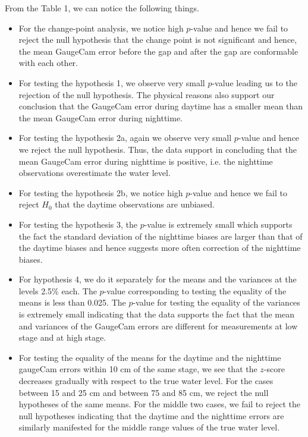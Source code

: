\documentclass[]{article}
\begin{document}
From the Table 1, we can notice the following things.

\begin{itemize}
\item For the change-point analysis, we notice high $p$-value and hence we fail to reject the null hypothesis that the change point is not significant and hence, the mean GaugeCam error before the gap and after the gap are conformable with each other.
\item For testing the hypothesis 1, we observe very small $p$-value leading us to the rejection of the null hypothesis. The physical reasons also support our conclusion that the GaugeCam error during daytime has a smaller mean than the mean GaugeCam error during nighttime.
\item For testing the hypothesis 2a, again we observe very small $p$-value and hence we reject the null hypothesis. Thus, the data support in concluding that the mean GaugeCam error during nighttime is positive, i.e. the nighttime observations overestimate the water level.
\item For testing the hypothesis 2b, we notice high $p$-value and hence we fail to reject $H_0$ that the daytime observations are unbiased.
\item For testing the hypothesis 3, the $p$-value is extremely small which supports the fact the standard deviation of the nighttime biases are larger than that of the daytime biases and hence suggests more often correction of the nighttime biases. 
\item For hypothesis 4, we do it separately for the means and the variances at the levels 2.5\% each. The $p$-value corresponding to testing the equality of the means is less than 0.025. The $p$-value for testing the equality of the variances is extremely small indicating that the data supports the fact that the mean and variances of the GaugeCam errors are different for measurements at low stage and at high stage.
\item For testing the equality of the means for the daytime and the nighttime gaugeCam errors within 10 cm of the same stage, we see that the $z$-score decreases gradually with respect to the true water level. For the cases between 15 and 25 cm and between 75 and 85 cm, we reject the null hypotheses of the same means. For the middle two cases, we fail to reject the null hypotheses indicating that the daytime and the nighttime errors are similarly manifested for the middle range values of the true water level.
\end{itemize}
\end{document}
